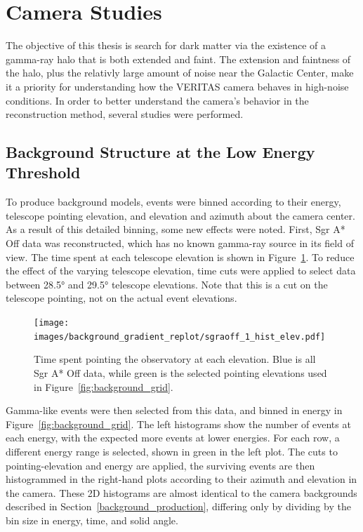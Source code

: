   \FloatBarrier

\section{Camera Studies}
  The objective of this thesis is search for dark matter via the existence of a gamma-ray halo that is both extended and faint.
  The extension and faintness of the halo, plus the relativly large amount of noise near the Galactic Center, make it a priority for understanding how the VERITAS camera behaves in high-noise conditions.
  In order to better understand the camera's behavior in the reconstruction method, several studies were performed.

  \subsection{Background Structure at the Low Energy Threshold}\label{subsec:bkgstructure}
    To produce background models, events were binned according to their energy, telescope pointing elevation, and elevation and azimuth about the camera center.
    As a result of this detailed binning, some new effects were noted.
    First, Sgr A* Off data was reconstructed, which has no known gamma-ray source in its field of view.
    The time spent at each telescope elevation is shown in Figure~\ref{fig:back_elevhist}.
    To reduce the effect of the varying telescope elevation, time cuts were applied to select data between \ang{28.5} and \ang{29.5} telescope elevations.
    Note that this is a cut on the telescope pointing, not on the actual event elevations.

    \begin{figure}[bt]
      \centering
      \texttt{[image: images/background\_gradient\_replot/sgraoff\_1\_hist\_elev.pdf]}
      \caption[Elevation Slice of Sgr A* Off data]{
        Time spent pointing the observatory at each elevation.
        Blue is all Sgr A* Off data, while green is the selected pointing elevations used in Figure~\ref{fig:background_grid}.
      }
      \label{fig:back_elevhist}
    \end{figure}
    
    Gamma-like events were then selected from this data, and binned in energy in Figure~\ref{fig:background_grid}.
    The left histograms show the number of events at each energy, with the expected more events at lower energies.
    For each row, a different energy range is selected, shown in green in the left plot.
    The cuts to pointing-elevation  and energy are applied, the surviving events are then histogrammed in the right-hand plots according to their azimuth and elevation in the camera.
    These 2D histograms are almost identical to the camera backgrounds described in Section~\ref{background_production}, differing only by dividing by the bin size in energy, time, and solid angle.
    
